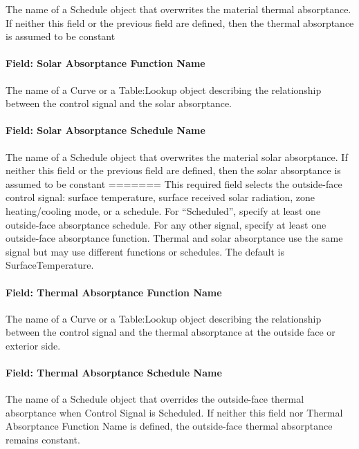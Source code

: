 The name of a Schedule object that overwrites the material thermal absorptance.
If neither this field or the previous field are defined, then the thermal absorptance is assumed to be constant

\paragraph{Field: Solar Absorptance Function Name}\label{field-solar-absorptance-function-name}

The name of a Curve or a Table:Lookup object describing the relationship between the control signal and the solar absorptance.

\paragraph{Field: Solar Absorptance Schedule Name}\label{field-solar-absorptance-schedule-name}

The name of a Schedule object that overwrites the material solar absorptance.
If neither this field or the previous field are defined, then the solar absorptance is assumed to be constant
=======
This required field selects the outside-face control signal: surface temperature, surface received solar radiation, zone heating/cooling mode, or a schedule. For ``Scheduled'', specify at least one outside-face absorptance schedule. For any other signal, specify at least one outside-face absorptance function. Thermal and solar absorptance use the same signal but may use different functions or schedules. The default is SurfaceTemperature.

\paragraph{Field: Thermal Absorptance Function Name}\label{field-thermal-absorptance-function-name}

The name of a Curve or a Table:Lookup object describing the relationship between the control signal and the thermal absorptance at the outside face or exterior side.

\paragraph{Field: Thermal Absorptance Schedule Name}\label{field-thermal-absorptance-schedule-name}

The name of a Schedule object that overrides the outside-face thermal absorptance when Control Signal is Scheduled. If neither this field nor Thermal Absorptance Function Name is defined, the outside-face thermal absorptance remains constant.


